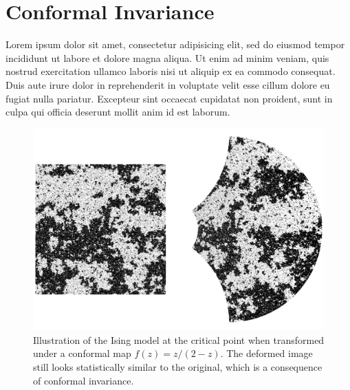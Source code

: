 \section{Conformal Invariance}
\label{ch:conf}

Lorem ipsum dolor sit amet, consectetur adipisicing elit, sed do eiusmod tempor
incididunt ut labore et dolore magna aliqua. Ut enim ad minim veniam, quis
nostrud exercitation ullamco laboris nisi ut aliquip ex ea commodo consequat.
Duis aute irure dolor in reprehenderit in voluptate velit esse cillum dolore eu
fugiat nulla pariatur. Excepteur sint occaecat cupidatat non proident, sunt in
culpa qui officia deserunt mollit anim id est laborum.

\begin{figure}
\begin{center}
    \includegraphics[scale=0.4]{chapters/ch3-conf/figs/isingcm}
\end{center}
\caption{Illustration of the Ising model at the critical point when transformed
    under a conformal map $f(z)=z/(2-z)$. The deformed image still looks
    statistically similar to the original, which is a consequence of conformal
    invariance.}
\label{fig:isingcm}
\end{figure}

